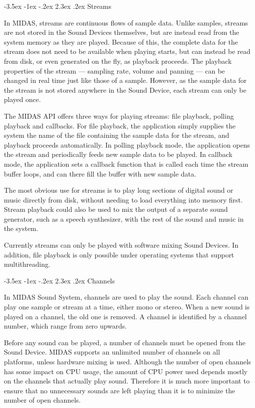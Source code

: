 \documentclass[a4paper,12pt,oneside]{book}
\makeatletter
\renewcommand\section{\@startsection {section}{1}{-20pt}%
                                   {-3.5ex \@plus -1ex \@minus -.2ex}%
                                   {2.3ex \@plus.2ex}%
                                   {\normalfont\Large\bfseries}}
\makeatother
\begin{document}
\section{Streams}

In MIDAS, streams are continuous flows of sample data. Unlike samples,
streams are not stored in the Sound Devices themselves, but are instead read
from the system memory as they are played. Because of this, the complete data
for the stream does not need to be available when playing starts, but can
instead be read from disk, or even generated on the fly, as playback
proceeds. The playback properties of the stream --- sampling rate, volume and
panning --- can be changed in real time just like those of a sample. However,
as the sample data for the stream is not stored anywhere in the Sound Device,
each stream can only be played once.

The MIDAS API offers three ways for playing streams: file playback, polling
playback and callbacks. For file playback, the application simply supplies
the system the name of the file containing the sample data for the stream,
and playback proceeds automatically. In polling playback mode, the
application opens the stream and periodically feeds new sample data to be
played. In callback mode, the application sets a callback function that is
called each time the stream buffer loops, and can there fill the buffer with
new sample data.

The most obvious use for streams is to play long sections of digital sound or
music directly from disk, without needing to load everything into memory
first. Stream playback could also be used to mix the output of a separate
sound generator, such as a speech synthesizer, with the rest of the sound and
music in the system.

Currently streams can only be played with software mixing Sound Devices. In
addition, file playback is only possible under operating systems that
support multithreading.


\section{Channels}

In MIDAS Sound System, channels are used to play the sound. Each channel can
play one sample or stream at a time, either mono or stereo. When a new sound
is played on a channel, the old one is removed. A channel is identified by a
channel number, which range from zero upwards.

Before any sound can be played, a number of channels must be opened from the
Sound Device. MIDAS supports an unlimited number of channels on all
platforms, unless hardware mixing is used. Although the number of open
channels has some impact on CPU usage, the amount of CPU power used depends
mostly on the channels that actually play sound. Therefore it is much more
important to ensure that no unnecessary sounds are left playing than it is to
minimize the number of open channels.
\end{document}
